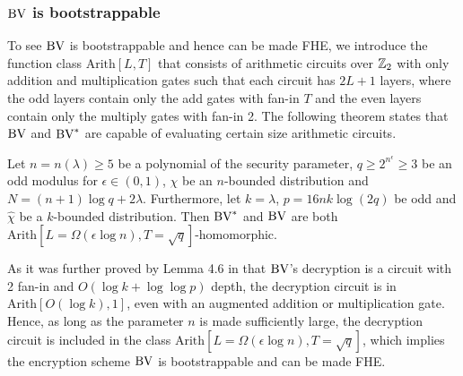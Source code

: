 \documentclass[../main.tex]{subfiles}
\begin{document}
\subsubsection{$\text{BV}$ is bootstrappable}

To see $\text{BV}$ is bootstrappable and hence can be made FHE, we introduce the function class $\text{Arith}[L,T]$ that consists of arithmetic circuits over $\mathbb{Z}_2$ with only addition and multiplication gates such that each circuit has $2L+1$ layers, where the odd layers contain only the add gates with fan-in $T$ and the even layers contain only the multiply gates with fan-in 2. The following theorem states that $\text{BV}$ and $\text{BV}^*$ are capable of evaluating certain size arithmetic circuits. 

\begin{theorem}
Let $n=n(\lambda) \ge 5$ be a polynomial of the security parameter, $q \ge 2^{n^{\epsilon}} \ge 3$ be an odd modulus for $\epsilon \in (0,1)$, $\chi$ be an $n$-bounded distribution and $N=(n+1) \log q + 2 \lambda$. Furthermore, let $k=\lambda$, $p=16nk\log(2q)$ be odd and $\hat{\chi}$ be a $k$-bounded distribution. Then $\text{BV}^*$ and $\text{BV}$ are both $\text{Arith}[L=\Omega(\epsilon \log n), T=\sqrt{q}]$-homomorphic.   
\end{theorem}

As it was further proved by Lemma 4.6 in \cite{brakerski2014efficient} that $\text{BV}$'s decryption is a circuit with 2 fan-in and $O(\log k + \log \log p)$ depth, the decryption circuit is in $\text{Arith}[O(\log k), 1]$, even with an augmented addition or multiplication gate. Hence, as long as the parameter $n$ is made sufficiently large, the decryption circuit is included in the class $\text{Arith}[L=\Omega(\epsilon \log n), T=\sqrt{q}]$, which implies the encryption scheme $\text{BV}$ is bootstrappable and can be made FHE. 

\end{document}
